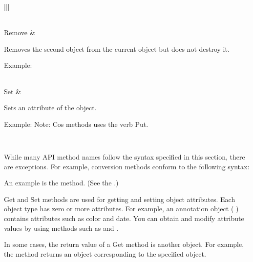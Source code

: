 \documentclass[letterpaper,12pt,english,openany,oneside]{sphinxmanual}
\begin{document}
\begin{savenotes}
\begin{tabular}[t]{|*{2}{|}}
\begin{DUlineblock}{0em}
\end{DUlineblock}
\\
\hline
Remove
&
\begin{DUlineblock}{0em}
\item[] Removes the second object from the current object but does not destroy it.
\item[] Example: 
\end{DUlineblock}
\\
\hline
Set
&
\begin{DUlineblock}{0em}
\item[] Sets an attribute of the object.
\item[] Example: 
Note: Cos methods uses the verb Put.
\end{DUlineblock}
\\
\hline
\end{tabular}
\par
\sphinxattableend\end{savenotes}

While many API method names follow the syntax specified in this section, there are exceptions. For example, conversion methods conform to the following syntax:

\begin{sphinxVerbatim}[commandchars=\\\{\}]
\end{sphinxVerbatim}

An example is the  method. (See the .)

Get and Set methods are used for getting and setting object attributes. Each object type has zero or more attributes. For example, an annotation object ( ) contains attributes such as color and date. You can obtain and modify attribute values by using methods such as  and .

In some cases, the return value of a Get method is another object. For example, the  method returns an  object corresponding to the specified  object.
\end{document}
